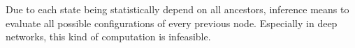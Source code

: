 Due to each state being statistically depend on all ancestors, inference means to evaluate all possible configurations of every previous node.
Especially in deep networks, this kind of computation is infeasible.\\





%





\newpage
